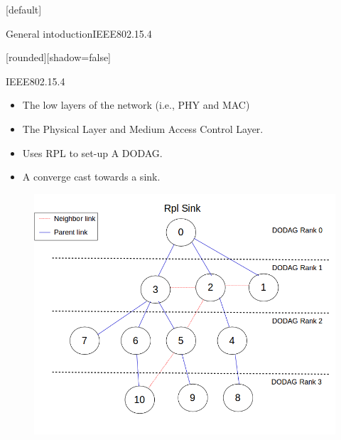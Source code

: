 \documentclass{beamer}
\makeatletter
\newenvironment{withoutheadline}{
        \setbeamertemplate{headline}[default]
        \def\beamer@entrycode{\vspace*{-\headheight}}
    }{}
\makeatother
\begin{document}
\begin{withoutheadline}
\begin{frame}{General intoduction}{IEEE802.15.4}

[rounded][shadow=false]


\begin{minipage}[t]{0.48\linewidth}

\begin{block}{IEEE802.15.4}
    \begin{itemize}
    \item The low layers of the network (i.e., PHY and MAC) 
    \item<2-> The Physical Layer and Medium Access Control Layer.
    
    \item<3-> Uses RPL to set-up A DODAG.
    \item<4> A converge cast towards a sink. 
    
    \end{itemize}
    \end{block}
\end{minipage}\hfill
\begin{minipage}[t]{0.48\linewidth}
\centering
\begin{figure}[p]

\includegraphics[width=\linewidth]{rpl3.png}
\end{figure}
\end{minipage}

   
    
    

\end{frame}
\end{withoutheadline}
\end{document}

